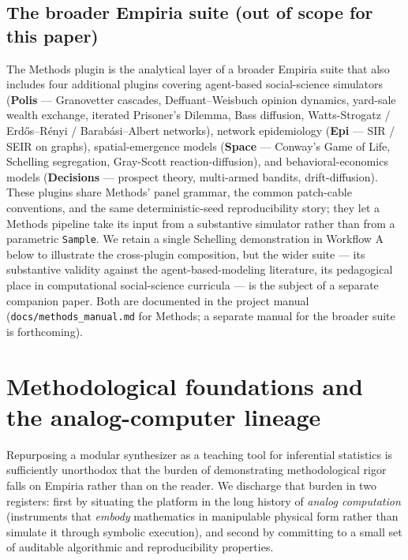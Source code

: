 \subsection{The broader Empiria suite (out of scope for this
paper)}\label{the-broader-empiria-suite-out-of-scope-for-this-paper}

The Methods plugin is the analytical layer of a broader Empiria suite
that also includes four additional plugins covering agent-based
social-science simulators (\textbf{Polis} --- Granovetter cascades,
Deffuant--Weisbuch opinion dynamics, yard-sale wealth exchange, iterated
Prisoner's Dilemma, Bass diffusion, Watts-Strogatz / Erdős--Rényi /
Barabási--Albert networks), network epidemiology (\textbf{Epi} --- SIR /
SEIR on graphs), spatial-emergence models (\textbf{Space} --- Conway's
Game of Life, Schelling segregation, Gray-Scott reaction-diffusion), and
behavioral-economics models (\textbf{Decisions} --- prospect theory,
multi-armed bandits, drift-diffusion). These plugins share Methods'
panel grammar, the common patch-cable conventions, and the same
deterministic-seed reproducibility story; they let a Methods pipeline
take its input from a substantive simulator rather than from a
parametric \texttt{Sample}. We retain a single Schelling demonstration
in Workflow A below to illustrate the cross-plugin composition, but the
wider suite --- its substantive validity against the
agent-based-modeling literature, its pedagogical place in computational
social-science curricula --- is the subject of a separate companion
paper. Both are documented in the project manual
(\texttt{docs/methods\_manual.md} for Methods; a separate manual for the
broader suite is forthcoming).

\section{Methodological foundations and the analog-computer
lineage}\label{methodological-foundations-and-the-analog-computer-lineage}

Repurposing a modular synthesizer as a teaching tool for inferential
statistics is sufficiently unorthodox that the burden of demonstrating
methodological rigor falls on Empiria rather than on the reader. We
discharge that burden in two registers: first by situating the platform
in the long history of \emph{analog computation} (instruments that
\emph{embody} mathematics in manipulable physical form rather than
simulate it through symbolic execution), and second by committing to a
small set of auditable algorithmic and reproducibility properties.

